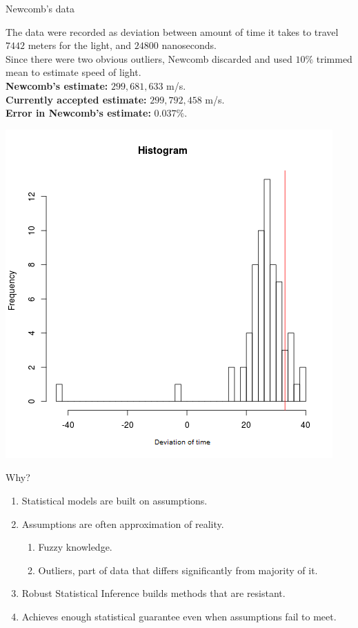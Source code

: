 \documentclass[10pt,xcolor=svgnames]{beamer} %
\begin{document}
\begin{frame}{Newcomb's data}
    \begin{minipage}{0.6\textwidth}
        The data were recorded as deviation between amount of time it takes to travel $7442$ meters for the light, and $24800$ nanoseconds.\\
        Since there were two obvious outliers, Newcomb discarded and used $10\%$ trimmed mean to estimate speed of light. \\
        \textbf{Newcomb's estimate:} $299,681,633$ m/s.\\
        \textbf{Currently accepted estimate:} $299,792,458$ m/s.\\
        \textbf{Error in Newcomb's estimate:} $0.037\%$.
    \end{minipage}
    \hfill
    \begin{minipage}{0.37\textwidth}
        \includegraphics[width = \textwidth]{images/histogram.png}
    \end{minipage}
\end{frame}


\begin{frame}{Why?}
    \begin{enumerate}
        \item Statistical models are built on assumptions.
        \item Assumptions are often approximation of reality.
        \begin{enumerate}
            \item Fuzzy knowledge.
            \item Outliers, part of data that differs significantly from majority of it.
        \end{enumerate}
        \item Robust Statistical Inference builds methods that are resistant.
        \item Achieves enough statistical guarantee even when assumptions fail to meet.
    \end{enumerate}
\end{frame}
\end{document}
